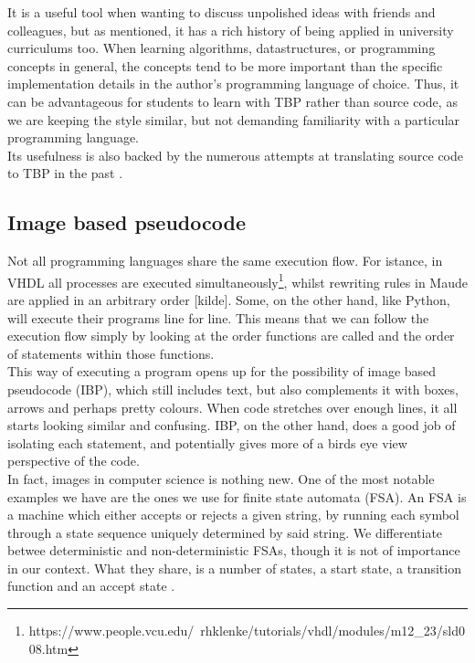 It is a useful tool when wanting to discuss unpolished ideas with friends and colleagues, but as mentioned, it has a rich history of being applied in university curriculums too. When learning algorithms, datastructures, or programming concepts in general, the concepts tend to be more important than the specific implementation details in the author’s programming language of choice. Thus, it can be advantageous for students to learn with TBP rather than source code, as we are keeping the style similar, but not demanding familiarity with a particular programming language. \hfill \\

Its usefulness is also backed by the numerous attempts at translating source code to TBP in the past \cite{PSEU:/Kreher/Stinson}\cite{DBLP:conf/kbse/OdaFNHSTN15}\cite{DBLP:conf/aswec/AlhefdhiDHG18}.

\subsection{Image based pseudocode}

Not all programming languages share the same execution flow. For istance, in VHDL all processes are executed simultaneously\footnote{https://www.people.vcu.edu/~rhklenke/tutorials/vhdl/modules/m12\_23/sld008.htm}, whilst rewriting rules in Maude are applied in an arbitrary order [kilde]. Some, on the other hand, like Python, will execute their programs line for line. This means that we can follow the execution flow simply by looking at the order functions are called and the order of statements within those functions. \hfill \\

This way of executing a program opens up for the possibility of image based pseudocode (IBP), which still includes text, but also complements it with boxes, arrows and perhaps pretty colours. When code stretches over enough lines, it all starts looking similar and confusing. IBP, on the other hand, does a good job of isolating each statement, and potentially gives more of a birds eye view perspective of the code. \hfill \\

In fact, images in computer science is nothing new. One of the most notable examples we have are the ones we use for finite state automata (FSA). An FSA is a machine which either accepts or rejects a given string, by running each symbol through a state sequence uniquely determined by said string. We differentiate betwee deterministic and non-deterministic FSAs, though it is not of importance in our context. What they share, is a number of states, a start state, a transition function and an accept state \cite{introToAutomataTheory}.

